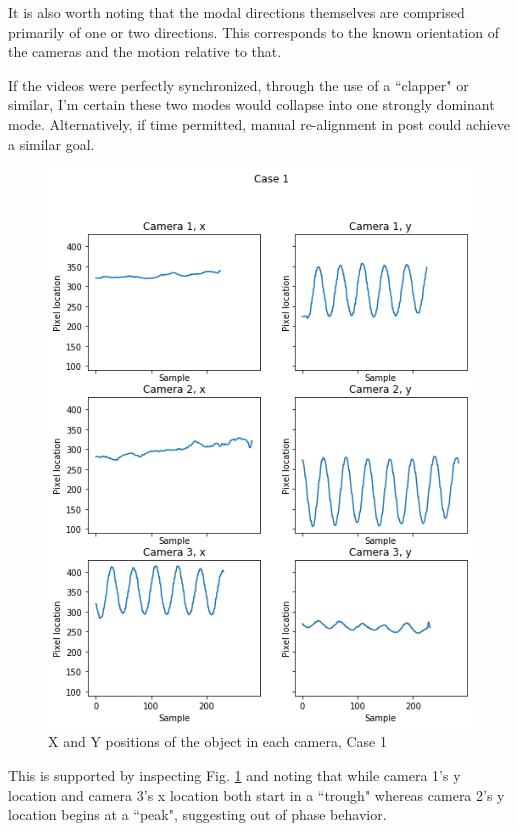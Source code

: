 \documentclass[journal]{IEEEtran}
\begin{document}
It is also worth noting that the modal directions themselves are comprised primarily of one or two
directions. This corresponds to the known orientation of the cameras and the motion relative
to that.

If the videos were perfectly synchronized, through the use of a ``clapper" or similar, I'm
certain these two modes would collapse into one strongly dominant mode. Alternatively, if time
permitted, manual re-alignment in post could achieve a similar goal.

\begin{figure}
    \centerline{\includegraphics[width=\columnwidth]{case1.png}}
    \caption{X and Y positions of the object in each camera, Case 1}
    \label{case1}
\end{figure}

This is supported by inspecting Fig. \ref{case1} and noting that while camera 1's y location and
camera 3's x location both start in a ``trough" whereas camera 2's y location begins at a ``peak",
suggesting out of phase behavior.
\end{document}

